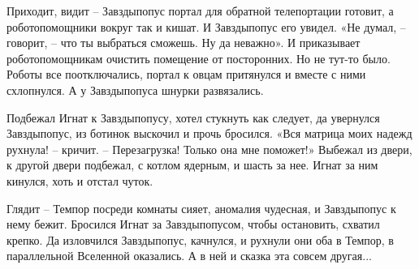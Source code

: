\documentclass[ebook,oneside,final,openright]{memoir}
\begin{document}
\par
Приходит, видит – Завздыпопус портал для обратной телепортации готовит, а роботопомощники вокруг так и кишат. И Завздыпопус его увидел. «Не думал, – говорит, – что ты выбраться сможешь. Ну да неважно». И приказывает роботопомощникам очистить помещение от посторонних. Но не тут-то было. Роботы все поотключались, портал к овцам притянулся и вместе с ними схлопнулся. А у Завздыпопуса шнурки развязались.\par
\par
Подбежал Игнат к Завздыпопусу, хотел стукнуть как следует, да увернулся Завздыпопус, из ботинок выскочил и прочь бросился. «Вся матрица моих надежд рухнула! – кричит. – Перезагрузка! Только она мне поможет!» Выбежал из двери, к другой двери подбежал, с котлом ядерным, и шасть за нее. Игнат за ним кинулся, хоть и отстал чуток.\par
\par
Глядит – Темпор посреди комнаты сияет, аномалия чудесная, и Завздыпопус к нему бежит. Бросился Игнат за Завздыпопусом, чтобы остановить, схватил крепко. Да изловчился Завздыпопус, качнулся, и рухнули они оба в Темпор, в параллельной Вселенной оказались. А в ней и сказка эта совсем другая...\par
\end{document}

